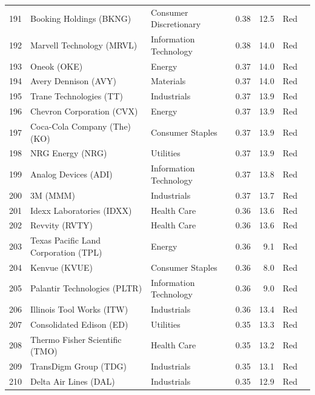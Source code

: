 \documentclass[11pt,a4paper]{article}
\begin{document}
{\begin{longtable}{r p{4.4cm} p{2.8cm} r r l l}
191 & Booking Holdings (BKNG) & Consumer Discretionary & 0.38 & 12.5 & \cellcolor[HTML]{F4B6B6}Red &  \\
192 & Marvell Technology (MRVL) & Information Technology & 0.38 & 14.0 & \cellcolor[HTML]{F4B6B6}Red &  \\
193 & Oneok (OKE) & Energy & 0.37 & 14.0 & \cellcolor[HTML]{F4B6B6}Red &  \\
194 & Avery Dennison (AVY) & Materials & 0.37 & 14.0 & \cellcolor[HTML]{F4B6B6}Red &  \\
195 & Trane Technologies (TT) & Industrials & 0.37 & 13.9 & \cellcolor[HTML]{F4B6B6}Red &  \\
196 & Chevron Corporation (CVX) & Energy & 0.37 & 13.9 & \cellcolor[HTML]{F4B6B6}Red &  \\
197 & Coca-Cola Company (The) (KO) & Consumer Staples & 0.37 & 13.9 & \cellcolor[HTML]{F4B6B6}Red &  \\
198 & NRG Energy (NRG) & Utilities & 0.37 & 13.9 & \cellcolor[HTML]{F4B6B6}Red &  \\
199 & Analog Devices (ADI) & Information Technology & 0.37 & 13.8 & \cellcolor[HTML]{F4B6B6}Red &  \\
200 & 3M (MMM) & Industrials & 0.37 & 13.7 & \cellcolor[HTML]{F4B6B6}Red &  \\
201 & Idexx Laboratories (IDXX) & Health Care & 0.36 & 13.6 & \cellcolor[HTML]{F4B6B6}Red &  \\
202 & Revvity (RVTY) & Health Care & 0.36 & 13.6 & \cellcolor[HTML]{F4B6B6}Red &  \\
203 & Texas Pacific Land Corporation (TPL) & Energy & 0.36 & 9.1 & \cellcolor[HTML]{F4B6B6}Red &  \\
204 & Kenvue (KVUE) & Consumer Staples & 0.36 & 8.0 & \cellcolor[HTML]{F4B6B6}Red &  \\
205 & Palantir Technologies (PLTR) & Information Technology & 0.36 & 9.0 & \cellcolor[HTML]{F4B6B6}Red &  \\
206 & Illinois Tool Works (ITW) & Industrials & 0.36 & 13.4 & \cellcolor[HTML]{F4B6B6}Red &  \\
207 & Consolidated Edison (ED) & Utilities & 0.35 & 13.3 & \cellcolor[HTML]{F4B6B6}Red &  \\
208 & Thermo Fisher Scientific (TMO) & Health Care & 0.35 & 13.2 & \cellcolor[HTML]{F4B6B6}Red &  \\
209 & TransDigm Group (TDG) & Industrials & 0.35 & 13.1 & \cellcolor[HTML]{F4B6B6}Red &  \\
210 & Delta Air Lines (DAL) & Industrials & 0.35 & 12.9 & \cellcolor[HTML]{F4B6B6}Red &  \\

\end{longtable}}
\end{document}

